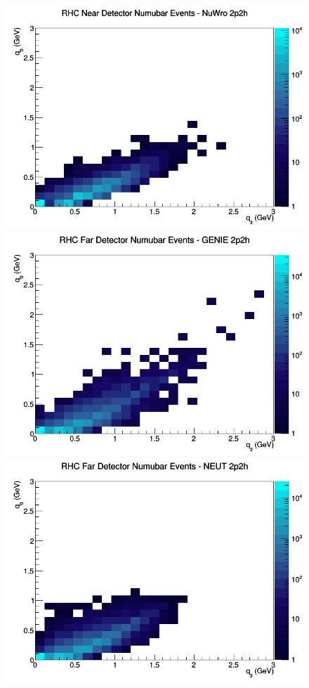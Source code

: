 \documentclass[12pt]{article}
\begin{document}
\begin{figure}[h]
\includegraphics[width=\linewidth]{eff_q0_q3/FGT/2p2h_RHC_ND_numubar_q3_q0_NuWro.png}
\endminipage
\newline
{}
\includegraphics[width=\linewidth]{eff_q0_q3/FGT/2p2h_RHC_FD_numubar_q3_q0_GENIE.png}
\endminipage
{}
\includegraphics[width=\linewidth]{eff_q0_q3/FGT/2p2h_RHC_FD_numubar_q3_q0_NEUT.png}

\end{figure}
\end{document}
